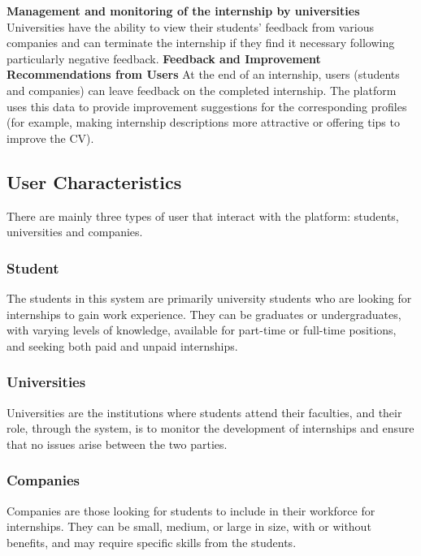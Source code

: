 \documentclass{article}
\begin{document}
\textbf{Management and monitoring of the internship by universities}\newline
Universities have the ability to view their students' feedback from various companies and can terminate the internship if they find it necessary following particularly negative feedback.\newline
\newline
\textbf{Feedback and Improvement Recommendations from Users}\newline
At the end of an internship, users (students and companies) can leave feedback on the completed internship. The platform uses this data to provide improvement suggestions for the corresponding profiles (for example, making internship descriptions more attractive or offering tips to improve the CV).\newline
\newline

\subsection{User Characteristics}
There are mainly three types of user that interact with the platform: students, universities and companies.\newline

\subsubsection{Student}
The students in this system are primarily university students who are looking for internships to gain work experience. They can be graduates or undergraduates, with varying levels of knowledge, available for part-time or full-time positions, and seeking both paid and unpaid internships.

\subsubsection{Universities}
Universities are the institutions where students attend their faculties, and their role, through the system, is to monitor the development of internships and ensure that no issues arise between the two parties.

\subsubsection{Companies}
Companies are those looking for students to include in their workforce for internships. They can be small, medium, or large in size, with or without benefits, and may require specific skills from the students.
\end{document}

